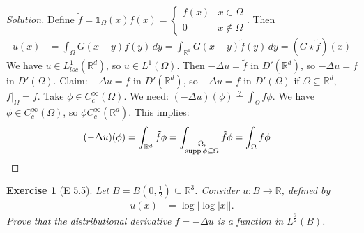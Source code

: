 \documentclass{report}
\theoremstyle{tommy}
\newtheorem{ex}[defn]{Exercise}
\newcommand{\supp}{\operatorname{supp}}
\begin{document}
  \begin{proof}[Solution]
    Define \(\tilde f = \mathbb{1}_\Omega(x) f(x) = \begin{cases}
      f(x) & x \in \Omega \\ 0 & x \notin \Omega
    \end{cases}\). Then 
    \begin{align*}
      u(x) &= \int_{\Omega} G(x-y)f(y) \, dy = \int_{\mathbb{R}^d} G(x-y) \tilde f(y) \, dy = (G \star \tilde f)(x)
    \end{align*}
    We have \(u \in L_{loc}^1(\mathbb{R}^d)\), so \(u \in L^1(\Omega)\).
    Then \(- \Delta u = \tilde f\) in \(D'(\mathbb{R}^d)\), so \(- \Delta u = f\) in \(D'(\Omega)\). Claim: \(- \Delta u = f\) in \(D'(\mathbb{R}^d)\), so \(- \Delta u = f\) in \(D'(\Omega)\) if \(\Omega \subseteq \mathbb{R}^d\), \(\tilde f|_\Omega = f\). Take \(\phi \in C_c^\infty(\Omega)\). We need: \((- \Delta u)(\phi) \overset{?}{=} \int_\Omega f \phi\). We have \(\phi \in C_c^\infty(\Omega)\), so \(\phi C_c^\infty(\mathbb{R}^d)\). This implies:
    \begin{align*}
      (- \Delta u)(\phi) 
      &= \int_{\mathbb{R}^d} \tilde f \phi 
      = \int_{\substack{\Omega, \\ \supp \phi \subseteq \Omega}} \tilde f \phi = \int_\Omega f \phi \qedhere
    \end{align*}
  \end{proof}

  \begin{ex}[E 5.5]
    Let \(B = B\left(0, \frac{1}{2}\right) \subseteq \mathbb{R}^3\). Consider \(u: B \to \mathbb{R}\), defined by 
    \begin{align*}
      u(x) &= \log|\log|x||.
    \end{align*}
    Prove that the distributional derivative \(f = - \Delta u\) is a function in \(L^{\frac{3}{2}}(B)\).
  \end{ex}
\end{document}
